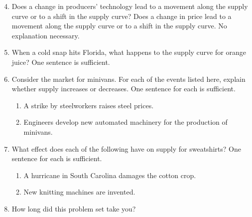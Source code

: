\documentclass{article}
\begin{document}
\begin{enumerate}
\setcounter{enumi}{3}

\item Does a change in producers' technology lead to a movement along the supply curve or to a shift in the supply curve? Does a change in price lead to a movement along the supply curve or to a shift in the supply curve. No explanation necessary.

\item When a cold snap hits Florida, what happens to the supply curve for orange juice? One sentence is sufficient.

\item Consider the market for minivans. For each of the events listed here, explain whether supply increases or decreases. One sentence for each is sufficient.

	\begin{enumerate}
	
	\item A strike by steelworkers raises steel prices.
	
	\item Engineers develop new automated machinery for the production of minivans.
	
	\end{enumerate}
	
\item What effect does each of the following have on supply for sweatshirts? One sentence for each is sufficient. 

	\begin{enumerate}
	
	\item A hurricane in South Carolina damages the cotton crop.
	
	\item New knitting machines are invented. 
	
	\end{enumerate}
	
\item How long did this problem set take you?

\end{enumerate}
\end{document}
